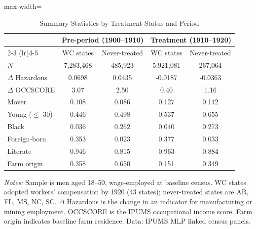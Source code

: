\begin{table}[t]
\centering
\caption{Summary Statistics by Treatment Status and Period}
\label{tab:summary}
\begin{adjustbox}{max width=\textwidth}
\begin{threeparttable}
\begin{tabular}{@{}lcccc@{}}
\toprule
& \multicolumn{2}{c}{Pre-period (1900--1910)} & \multicolumn{2}{c}{Treatment (1910--1920)} \\
\cmidrule(lr){2-3} \cmidrule(lr){4-5}
& WC states & Never-treated & WC states & Never-treated \\
\midrule
$N$ & 7,283,468 & 485,923 & 5,921,081 & 267,064 \\
$\Delta$ Hazardous & 0.0698 & 0.0435 & -0.0187 & -0.0363 \\
$\Delta$ OCCSCORE & 3.07 & 2.50 & 0.40 & 1.16 \\
Mover & 0.108 & 0.086 & 0.127 & 0.142 \\
Young ($\leq$ 30) & 0.446 & 0.498 & 0.537 & 0.655 \\
Black & 0.036 & 0.262 & 0.040 & 0.273 \\
Foreign-born & 0.353 & 0.023 & 0.377 & 0.033 \\
Literate & 0.946 & 0.815 & 0.963 & 0.884 \\
Farm origin & 0.358 & 0.650 & 0.151 & 0.349 \\
\bottomrule
\end{tabular}
\begin{tablenotes}[flushleft]
\small
\item \textit{Notes:} Sample is men aged 18--50, wage-employed at baseline census. WC states adopted workers' compensation by 1920 (43 states); never-treated states are AR, FL, MS, NC, SC. $\Delta$ Hazardous is the change in an indicator for manufacturing or mining employment. OCCSCORE is the IPUMS occupational income score. Farm origin indicates baseline farm residence. Data: IPUMS MLP linked census panels.
\end{tablenotes}
\end{threeparttable}
\end{adjustbox}
\end{table}
